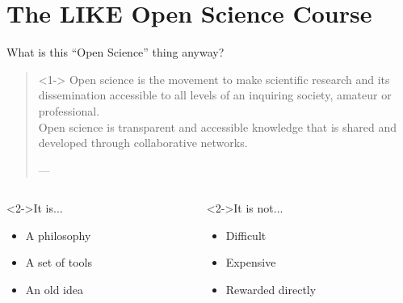 \section[The course]{The LIKE Open Science Course}
\label{sec:course}

\begin{frame}{What is this ``Open Science'' thing anyway?}

\begin{quotation}<1->
Open science is the movement to make scientific research and its dissemination accessible to all levels of an inquiring society, amateur or professional. \\
Open science is transparent and accessible knowledge that is shared and developed through collaborative networks.
\begin{flushright}
    \tiny{---}
  \end{flushright}
\end{quotation}

\begin{columns}
    \begin{column}{.45\textwidth}
        \begin{block}<2->{It is...}
            \begin{itemize}
                \item A philosophy
                \item A set of tools
                \item An old idea
            \end{itemize}
        \end{block}
    \end{column}
    
    \begin{column}{.45\textwidth}
        \begin{block}<2->{It is not...}
            \begin{itemize}
                \item Difficult
                \item Expensive
                \item Rewarded directly
            \end{itemize}
        \end{block}
    \end{column}
    
\end{columns}

\end{frame}


